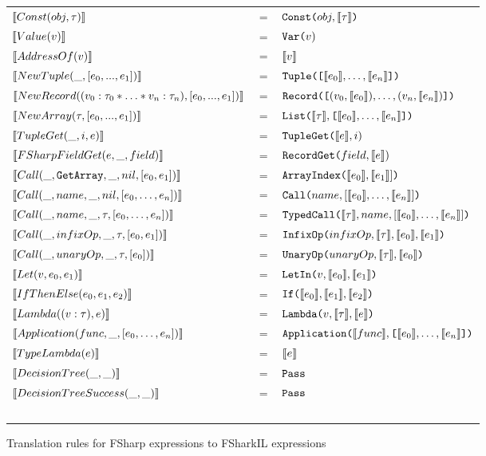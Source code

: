 \begin{figure}
  \centering
  \begin{tabular}{@{}l c l}%
  $\evals{Const(obj, \tau)}$ & $=$ & $\lit{Const(}obj, \evals{\tau} \lit{)}$ \\
  $\evals{Value(v)}$ & $=$ & $\lit{Var(}v{)}$ \\
  $\evals{AddressOf(v)}$ & $=$ & $\evals{v}$ \\
  $\evals{NewTuple(\_, [e_0,...,e_1])}$ & $=$ & $\lit{Tuple([}\evals{e_0},\ldots, \evals{e_n}\lit{])}$ \\
  $\evals{NewRecord((v_0 : \tau_0 * \ldots * v_n : \tau_n), [e_0,...,e_1])}$ & $=$ & $\lit{Record([}(v_0,\evals{e_0}),\ldots,(v_n,\evals{e_n})\lit{])}$ \\
  $\evals{NewArray(\tau, [e_0,...,e_1])}$ & $=$ & $\lit{List(}\evals{\tau},\lit{[}\evals{e_0},\ldots, \evals{e_n}\lit{]}\lit{)}$ \\
  $\evals{TupleGet(\_, i, e)}$ & $=$ & $\lit{TupleGet(}\evals{e}, i{)}$ \\
  $\evals{FSharpFieldGet(e, \_, field)}$ & $=$ & $\lit{RecordGet(}field, \evals{e}{)}$ \\
    $\evals{Call(\_, \lit{GetArray}, \_, nil, [e_0, e_1])}$ & $=$ & $\lit{ArrayIndex(}\evals{e_0},\evals{e_1}]\lit{)}$ \\
    $\evals{Call(\_, name, \_, nil, [e_0, \ldots, e_n])}$ & $=$ & $\lit{Call(}name, [\evals{e_0},\ldots,\evals{e_n}]\lit{)}$ \\
    $\evals{Call(\_, name, \_, \tau, [e_0, \ldots, e_n])}$ & $=$ & $\lit{TypedCall(}\evals{\tau},name, [\evals{e_0}, \ldots, \evals{e_n}]\lit{)}$ \\
    $\evals{Call(\_, infixOp, \_, \tau, [e_0, e_1])}$ & $=$ & $\lit{InfixOp(}infixOp, \evals{\tau}, \evals{e_0}, \evals{e_1}\lit{)}$ \\
    $\evals{Call(\_, unaryOp, \_, \tau, [e_0])}$ & $=$ & $\lit{UnaryOp(}unaryOp, \evals{\tau}, \evals{e_0}\lit{)}$ \\
  $\evals{Let(v, e_0, e_1)}$ & $=$ & $\lit{LetIn(}v, \evals{e_0}, \evals{e_1}\lit{)}$ \\
  $\evals{IfThenElse(e_0, e_1, e_2)}$ & $=$ & $\lit{If(}\evals{e_0}, \evals{e_1}, \evals{e_2}\lit{)}$ \\
  $\evals{Lambda((v : \tau), e)}$ & $=$ & $\lit{Lambda(}v, \evals{\tau}, \evals{e} \lit{)}$ \\
  $\evals{Application(func, \_, [e_0, \ldots, e_n])}$ & $=$ & $\lit{Application(}\evals{func}, \lit{[}\evals{e_0},\ldots, \evals{e_n}\lit{])}$ \\
  $\evals{TypeLambda(e)}$ & $=$ & $\evals{e}$ \\
  $\evals{DecisionTree(\_, \_)}$ & $=$ & $\lit{Pass}$ \\
  $\evals{DecisionTreeSuccess(\_, \_)}$ & $=$ & $\lit{Pass}$ \\ ~ \\
\end{tabular}
\caption{Translation rules for FSharp expressions to FSharkIL expressions}
\end{figure}

